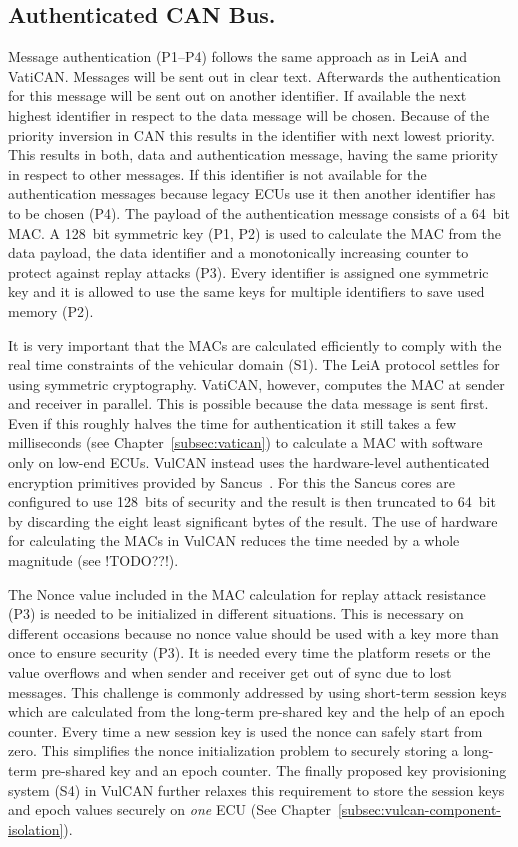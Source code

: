 \subsection{Authenticated CAN Bus. }

Message authentication (P1--P4) follows the same approach as in LeiA and VatiCAN\@. Messages will be sent out in clear text. Afterwards the authentication for this message will be sent out on another identifier. If available the next highest identifier in respect to the data message will be chosen. Because of the priority inversion in CAN this results in the identifier with next lowest priority. This results in both, data and authentication message, having the same priority in respect to other messages. If this identifier is not available for the authentication messages because legacy ECUs use it then another identifier has to be chosen (P4). The payload of the authentication message consists of a 64~bit MAC\@. A 128~bit symmetric key (P1, P2) is used to calculate the MAC from the data payload, the data identifier and a monotonically increasing counter to protect against replay attacks (P3). Every identifier is assigned one symmetric key and it is allowed to use the same keys for multiple identifiers to save used memory (P2).

It is very important that the MACs are calculated efficiently to comply with the
real time constraints of the vehicular domain (S1). The LeiA protocol settles
for using symmetric cryptography. VatiCAN, however, computes the MAC at sender
and receiver in parallel. This is possible because the data message is sent
first. Even if this roughly halves the time for authentication it still takes a
few milliseconds (see Chapter~\ref{subsec:vatican}) to calculate a MAC with
software only on low-end ECUs. VulCAN instead uses the hardware-level
authenticated encryption primitives provided by Sancus~\cite{Noorman}. For this
the Sancus cores are configured to use 128~bits of security and the result is
then truncated to 64~bit by discarding the eight least significant bytes of the
result. The use of hardware for calculating the MACs in VulCAN reduces the time
needed by a whole magnitude (see !TODO??!).

The Nonce value included in the MAC calculation for replay attack resistance
(P3) is needed to be initialized in different situations. This is necessary on
different occasions because no nonce value should be used with a key more than
once to ensure security (P3). It is needed every time the platform resets or the
value overflows and when sender and receiver get out of sync due to lost
messages. This challenge is commonly addressed by using short-term session keys
which are calculated from the long-term pre-shared key and the help of an epoch
counter. Every time a new session key is used the nonce can safely start from
zero. This simplifies the nonce initialization problem to securely storing a
long-term pre-shared key and an epoch counter. The finally proposed key provisioning system (S4) in VulCAN further relaxes this requirement to store the session keys and epoch values securely on \textit{one} ECU (See Chapter~\ref{subsec:vulcan-component-isolation}).

